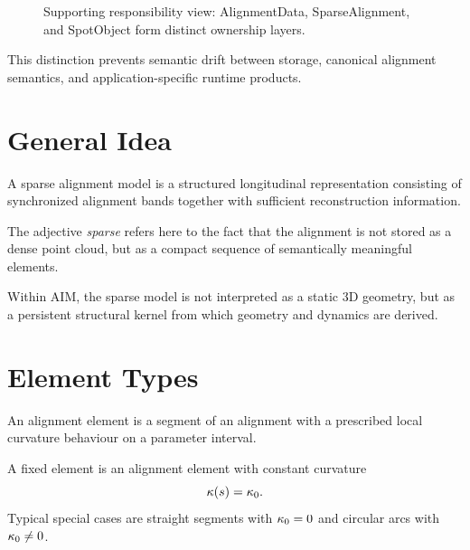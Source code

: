 \begin{figure}[htbp]
\centering

\caption{Supporting responsibility view: AlignmentData, SparseAlignment, and SpotObject form distinct ownership layers.}
\label{fig:support-alignmentdata-sparse-spotobject}
\end{figure}

This distinction prevents semantic drift between storage, canonical
alignment semantics, and application-specific runtime products.

\section{General Idea}

\begin{definition}
A sparse alignment model is a structured longitudinal representation
consisting of synchronized alignment bands together with sufficient
reconstruction information.
\end{definition}

The adjective \emph{sparse} refers here to the fact that the alignment
is not stored as a dense point cloud, but as a compact sequence of
semantically meaningful elements.

Within AIM, the sparse model is not interpreted as a static 3D geometry,
but as a persistent structural kernel from which geometry and dynamics
are derived.

\section{Element Types}

\begin{definition}
An alignment element is a segment of an alignment with a prescribed
local curvature behaviour on a parameter interval.
\end{definition}

\begin{definition}
A fixed element is an alignment element with constant curvature
\[
\kappa(s)=\kappa_0.
\]
Typical special cases are straight segments with $\kappa_0=0$ and
circular arcs with $\kappa_0\neq 0$.
\end{definition}

